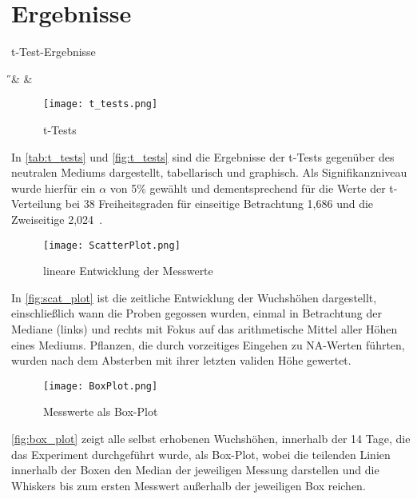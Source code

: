 \section{Ergebnisse} %
    \label{sec:ergebnisse}
    \begin{table}[h]
        \centering
        \caption{t-Test-Ergebnisse}
        \label{tab:t_tests}
        {\H & \pH & \NaCl}
    \end{table}

    \begin{figure}[h]
        \texttt{[image: t\_tests.png]}
        \caption{t-Tests}
        \label{fig:t_tests}
    \end{figure}
    In \autoref{tab:t_tests} und \autoref{fig:t_tests} sind die Ergebnisse der t-Tests gegenüber des neutralen Mediums dargestellt, tabellarisch und graphisch. Als Signifikanzniveau wurde hierfür ein \( \alpha \) von 5\% gewählt und dementsprechend für die Werte der t-Verteilung bei 38 Freiheitsgraden für einseitige Betrachtung 1,686 und die Zweiseitige 2,024\ \cite[vgl.][]{web:t-values}.
    \newpage

    \begin{figure}[h]
        \centering
        \texttt{[image: ScatterPlot.png]}
        \caption{lineare Entwicklung der Messwerte}
        \label{fig:scat_plot}
    \end{figure}
    In \autoref{fig:scat_plot} ist die zeitliche Entwicklung der Wuchshöhen dargestellt, einschließlich wann die Proben gegossen wurden, einmal in Betrachtung der Mediane (links) und rechts mit Fokus auf das arithmetische Mittel aller Höhen eines Mediums. Pflanzen, die durch vorzeitiges Eingehen zu NA-Werten führten, wurden nach dem Absterben mit ihrer letzten validen Höhe gewertet.

    \begin{figure}[h]
        \centering
        \texttt{[image: BoxPlot.png]}
        \caption{Messwerte als Box-Plot}
        \label{fig:box_plot}
    \end{figure}
    \autoref{fig:box_plot} zeigt alle selbst erhobenen Wuchshöhen, innerhalb der 14 Tage, die das Experiment durchgeführt wurde, als Box-Plot, wobei die teilenden Linien innerhalb der Boxen den Median der jeweiligen Messung darstellen und die Whiskers bis zum ersten Messwert außerhalb der jeweiligen Box reichen.
    \newpage

